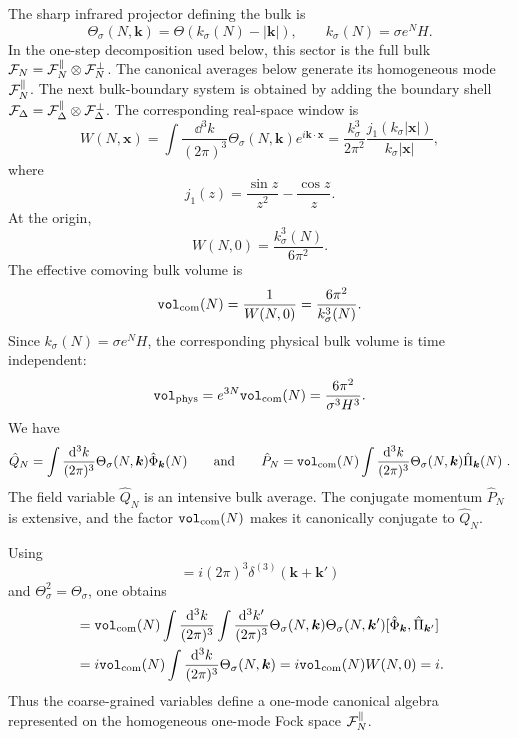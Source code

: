 \documentclass{article}
\def\cF{{\cal F}}
\newcommand{\VF}{\mathtt{vol}_{\rm com}}
\newcommand{\Vphys}{\mathtt{vol}_{\rm phys}}
\newcommand{\hvarphi}{\hat{\Phi}}
\newcommand{\hpi}{\hat{\Pi}}
\numberwithin{equation}{section}
\begin{document}
	The sharp infrared projector defining the bulk is
	\begin{equation}
		\Theta_\sigma(N,\bm k) = \Theta\!\left(k_\sigma(N)-|\bm k|\right), \qquad k_\sigma(N)=\sigma e^N H .
	\end{equation}
	In the one-step decomposition used below, this sector is the full bulk \(\cF_N=\cF_N^\parallel\otimes\cF_N^\perp\). The canonical averages below generate its homogeneous mode \(\cF_N^\parallel\). The next bulk-boundary system is obtained by adding the boundary shell \(\cF_\Delta=\cF_\Delta^\parallel\otimes\cF_\Delta^\perp\). The corresponding real-space window is
	\begin{equation}
		W(N,\bm x) = \int \frac{\dd^3k}{(2\pi)^3} \Theta_\sigma(N,\bm k)e^{i\bm k\cdot\bm x} = \frac{k_\sigma^3}{2\pi^2} \frac{j_1(k_\sigma|\bm x|)}{k_\sigma|\bm x|},
	\end{equation}
	where
	\begin{equation}
		j_1(z)=\frac{\sin z}{z^2}-\frac{\cos z}{z}.
	\end{equation}
	At the origin,
	\begin{equation}
		W(N,0)=\frac{k_\sigma^3(N)}{6\pi^2}.
	\end{equation}
	The effective comoving bulk volume is
	\begin{equation}
		\VF(N) = \frac{1}{W(N,0)} = \frac{6\pi^2}{k_\sigma^3(N)} .
	\end{equation}
	Since \(k_\sigma(N)=\sigma e^N H\), the corresponding physical bulk volume is time independent:
	\begin{equation}
		\Vphys = e^{3N}\VF(N) = \frac{6\pi^2}{\sigma^3H^3}.
		\label{eq:VphysApp}
	\end{equation}
	We have
	\begin{equation} \label{eq:QNPNmicroApp}
		\hat Q_N = \int \frac{\dd^3k}{(2\pi)^3} \Theta_\sigma(N,\bm k)\hvarphi_{\bm k}(N) \qquad \mathrm{and} \qquad \hat P_N = \VF(N) \int \frac{\dd^3k}{(2\pi)^3} \Theta_\sigma(N,\bm k)\hpi_{\bm k}(N)\ .
	\end{equation}
	The field variable \(\hat Q_N\) is an intensive bulk average. The conjugate momentum \(\hat P_N\) is extensive, and the factor \(\VF(N)\) makes it canonically conjugate to \(\hat Q_N\).

	Using
	\begin{equation}
		[\hvarphi_{\bm k}(N),\hpi_{\bm k'}(N)] = i(2\pi)^3\delta^{(3)}(\bm k+\bm k')
	\end{equation}
	and \(\Theta_\sigma^2=\Theta_\sigma\), one obtains
	\begin{align}
		[\hat Q_N,\hat P_N] &= \VF(N) \int\frac{\dd^3k}{(2\pi)^3} \int\frac{\dd^3k'}{(2\pi)^3} \Theta_\sigma(N,\bm k) \Theta_\sigma(N,\bm k') [\hvarphi_{\bm k},\hpi_{\bm k'}] \nonumber\\ &= i\VF(N) \int\frac{\dd^3k}{(2\pi)^3} \Theta_\sigma(N,\bm k) = i\VF(N)W(N,0) = i .
		\label{eq:Q_P_micro}
	\end{align}
	Thus the coarse-grained variables define a one-mode canonical algebra represented on the homogeneous one-mode Fock space \(\cF_N^\parallel\).
\end{document}
